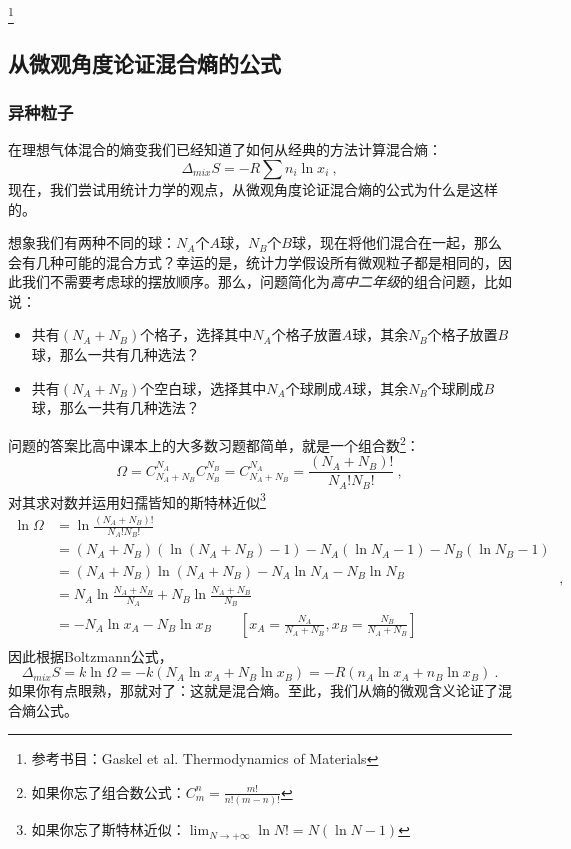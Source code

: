 


\footnote{参考书目：Gaskel et al. Thermodynamics of Materials}

\subsection{从微观角度论证混合熵的公式}
\subsubsection{异种粒子}
在理想气体混合的熵变我们已经知道了如何从经典的方法计算混合熵：
\begin{equation}
\Delta_{mix} S = - R \sum n_i \ln x_i~,
\end{equation}
现在，我们尝试用统计力学的观点，从微观角度论证混合熵的公式为什么是这样的。

想象我们有两种不同的球：$N_A$个$A$球，$N_B$个$B$球，现在将他们混合在一起，那么会有几种可能的混合方式？幸运的是，统计力学假设所有微观粒子都是相同的，因此我们不需要考虑球的摆放顺序。那么，问题简化为\textsl{高中二年级}的组合问题，比如说：
\begin{itemize}
\item 共有$(N_A+N_B)$个格子，选择其中$N_A$个格子放置$A$球，其余$N_B$个格子放置$B$球，那么一共有几种选法？
\item 共有$(N_A+N_B)$个空白球，选择其中$N_A$个球刷成$A$球，其余$N_B$个球刷成$B$球，那么一共有几种选法？
\end{itemize}
问题的答案比高中课本上的大多数习题都简单，就是一个组合数\footnote{如果你忘了组合数公式：$C^n_m = \frac{m!}{n!(m-n)!}$}：
\begin{equation}
\Omega = C^{N_A}_{N_A+N_B} C^{N_B}_{N_B} =  C^{N_A}_{N_A+N_B}  = \frac{(N_A+N_B)!}{N_A!N_B!}~,
\end{equation}
对其求对数并运用妇孺皆知的斯特林近似\footnote{如果你忘了斯特林近似：$\lim_{N \to +\infty} \ln N! = N (\ln N -1)$}
\begin{equation}
\begin{aligned}
\ln \Omega &= \ln \frac{(N_A+N_B)!}{N_A!N_B!} \\
 &= (N_A+N_B) (\ln (N_A+N_B) - 1) - N_A (\ln N_A - 1) - N_B (\ln N_B - 1) \\
 &= (N_A+N_B) \ln (N_A+N_B) - N_A \ln N_A - N_B \ln N_B \\
 &= N_A \ln \frac{N_A+N_B}{N_A} + N_B \ln \frac{N_A+N_B}{N_B} \\
 &= - N_A \ln x_A - N_B \ln x_B \qquad \left [x_A = \frac{N_A}{N_A+N_B}, x_B = \frac{N_B}{N_A+N_B} \right ]\\
\end{aligned}~,
\end{equation}
因此根据Boltzmann公式，
\begin{equation}
\Delta_{mix} S = k \ln \Omega = - k(N_A \ln x_A + N_B \ln x_B) = - R(n_A \ln x_A + n_B \ln x_B) ~.
\end{equation}
如果你有点眼熟，那就对了：这就是混合熵。至此，我们从熵的微观含义论证了混合熵公式。

